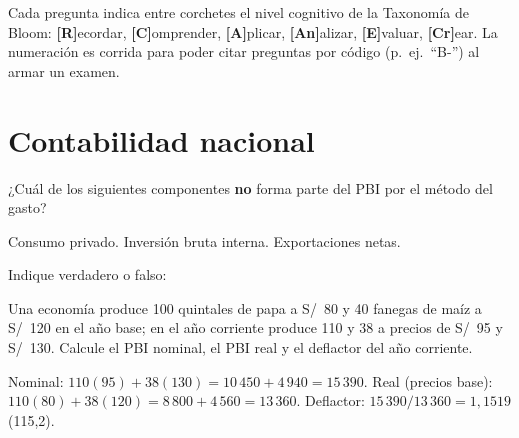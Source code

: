 \documentclass[claves]{academic-exam}
\begin{document}

\begin{instrucciones}
Cada pregunta indica entre corchetes el nivel cognitivo de la Taxonomía
de Bloom: \textbf{[R]}ecordar, \textbf{[C]}omprender, \textbf{[A]}plicar,
\textbf{[An]}alizar, \textbf{[E]}valuar, \textbf{[Cr]}ear. La numeración
es corrida para poder citar preguntas por código
(p.~ej.\ \enquote{B-\thepregunta}) al armar un examen.
\end{instrucciones}

\section{Contabilidad nacional}

\begin{pregunta}
¿Cuál de los siguientes componentes \textbf{no} forma parte del PBI por
el método del gasto?
\begin{opciones}
  \opcion Consumo privado.
  \opcion Inversión bruta interna.
  \opcion {}
  \opcion Exportaciones netas.
\end{opciones}
\end{pregunta}

\begin{pregunta}
Indique verdadero o falso:
\begin{tablavf}
\end{tablavf}
\end{pregunta}

\begin{pregunta}[][A · Cálculo]
Una economía produce 100 quintales de papa a S/~80 y 40 fanegas de maíz a
S/~120 en el año base; en el año corriente produce 110 y 38 a precios de
S/~95 y S/~130. Calcule el PBI nominal, el PBI real y el deflactor del
año corriente.
\begin{solucion}
Nominal: $110(95)+38(130) = 10\,450 + 4\,940 = 15\,390$.
Real (precios base): $110(80)+38(120) = 8\,800+4\,560 = 13\,360$.
Deflactor: $15\,390/13\,360 = 1{,}1519$ (115,2).
\end{solucion}
\end{pregunta}
\end{document}
